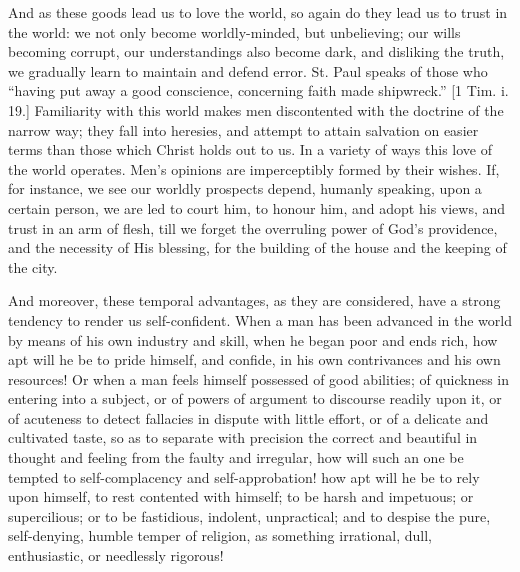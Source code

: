 And as these goods lead us to love the world, so again do they lead
us to trust in the world: we not only become worldly-minded, but
unbelieving; our wills becoming corrupt, our understandings also
become dark, and disliking the truth, we gradually learn to maintain
and defend error. St. Paul speaks of those who ``having put away a
good conscience, concerning faith made shipwreck.'' [1 Tim. i.
19.] Familiarity with this world makes men discontented with the
doctrine of the narrow way; they fall into heresies, and attempt to
attain salvation on easier terms than those which Christ holds out to
us. In a variety of ways this love of the world operates. Men's
opinions are imperceptibly formed by their wishes. If, for instance,
we see our worldly prospects depend, humanly speaking, upon a certain
person, we are led to court him, to honour him, and adopt his views,
and trust in an arm of flesh, till we forget the overruling power of
God's providence, and the necessity of His blessing, for the building
of the house and the keeping of the city.

And moreover, these temporal advantages, as they are considered,
have a strong tendency to render us self-confident. When a man has
been advanced in the world by means of his own industry and skill,
when he began poor and ends rich, how apt will he be to pride himself,
and confide, in his own contrivances and his own resources! Or when a
man feels himself possessed of good abilities; of quickness in
entering into a subject, or of powers of argument to discourse readily
upon it, or of acuteness to detect fallacies in dispute with little
effort, or of a delicate and cultivated taste, so as to separate with
precision the correct and beautiful in thought and feeling from the
faulty and irregular, how will such an one be tempted to
self-complacency and self-approbation! how apt will he be to rely upon
himself, to rest contented with himself; to be harsh and impetuous; or
supercilious; or to be fastidious, indolent, unpractical; and to
despise the pure, self-denying, humble temper of religion, as
something irrational, dull, enthusiastic, or needlessly rigorous!

